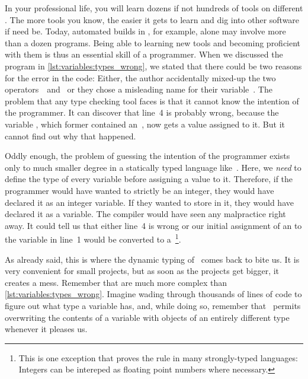 %
In your professional life, you will learn dozens if not hundreds of tools on different .
The more tools you know, the easier it gets to learn and dig into other software if need be.
Today, automated builds in , for example, alone may involve more than a dozen programs.
Being able to learning new tools and becoming proficient with them is thus an essential skill of a programmer.%
%
\endhsection%
%
%
\label{sec:varTypeHints}%
%
When we discussed the program  in \cref{lst:variables:types_wrong}, we stated that there could be two reasons for the error in the code:
Either, the author accidentally mixed-up the two operators~\pythonilIdx{/}~and~\pythonilIdx{//} or they chose a misleading name for their variable~.
The problem that any type checking tool faces is that it cannot know the intention of the programmer.
It can discover that line~4 is probably wrong, because the variable , which former contained an~, now gets a  value assigned to it.
But it cannot find out why that happened.

Oddly enough, the problem of guessing the intention of the programmer exists only to much smaller degree in a statically typed language like~.
Here, we \emph{need} to define the type of every variable before assigning a value to it.
Therefore, if the programmer would have wanted  to strictly be an integer, they would have declared it as an integer variable.
If they wanted to store  in it, they would have declared it as a  variable.
The compiler would have seen any malpractice right away.
It could tell us that either line~4 is wrong or our initial assignment of an  to the variable in line~1 would be converted to a~\footnote{%
This is one exception that proves the rule in many strongly-typed languages: Integers can be intereped as floating point numbers where necessary.%
}.

As already said, this is where the dynamic typing of \python\ comes back to bite us.
It is very convenient for small projects, but as soon as the projects get bigger, it creates a mess.
Remember that  are much more complex than \cref{lst:variables:types_wrong}.
Imagine wading through thousands of lines of code to figure out what type a variable has, and, while doing so, remember that \python\ permits overwriting the contents of a variable with objects of an entirely different type whenever it pleases us.


